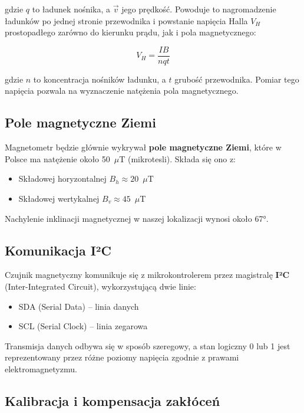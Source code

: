 \documentclass[12pt,a4paper]{article}
\begin{document}
gdzie $q$ to ładunek nośnika, a $\vec{v}$ jego prędkość. Powoduje to nagromadzenie ładunków po jednej stronie przewodnika i powstanie napięcia Halla $V_H$ prostopadłego zarówno do kierunku prądu, jak i pola magnetycznego:

\begin{equation}
V_H = \frac{IB}{nqt}
\end{equation}

gdzie $n$ to koncentracja nośników ładunku, a $t$ grubość przewodnika. Pomiar tego napięcia pozwala na wyznaczenie natężenia pola magnetycznego.

\subsection{Pole magnetyczne Ziemi}

Magnetometr będzie głównie wykrywał \textbf{pole magnetyczne Ziemi}, które w Polsce ma natężenie około 50~$\mu$T (mikrotesli). Składa się ono z:

\begin{itemize}
    \item Składowej horyzontalnej $B_h \approx 20$~$\mu$T
    \item Składowej wertykalnej $B_v \approx 45$~$\mu$T
\end{itemize}

Nachylenie inklinacji magnetycznej w naszej lokalizacji wynosi około 67°.

\subsection{Komunikacja I²C}

Czujnik magnetyczny komunikuje się z mikrokontrolerem przez magistralę \textbf{I²C} (Inter-Integrated Circuit), wykorzystującą dwie linie:
\begin{itemize}
    \item SDA (Serial Data) -- linia danych
    \item SCL (Serial Clock) -- linia zegarowa
\end{itemize}

Transmisja danych odbywa się w sposób szeregowy, a stan logiczny 0 lub 1 jest reprezentowany przez różne poziomy napięcia zgodnie z prawami elektromagnetyzmu.

\subsection{Kalibracja i kompensacja zakłóceń}
\end{document}

